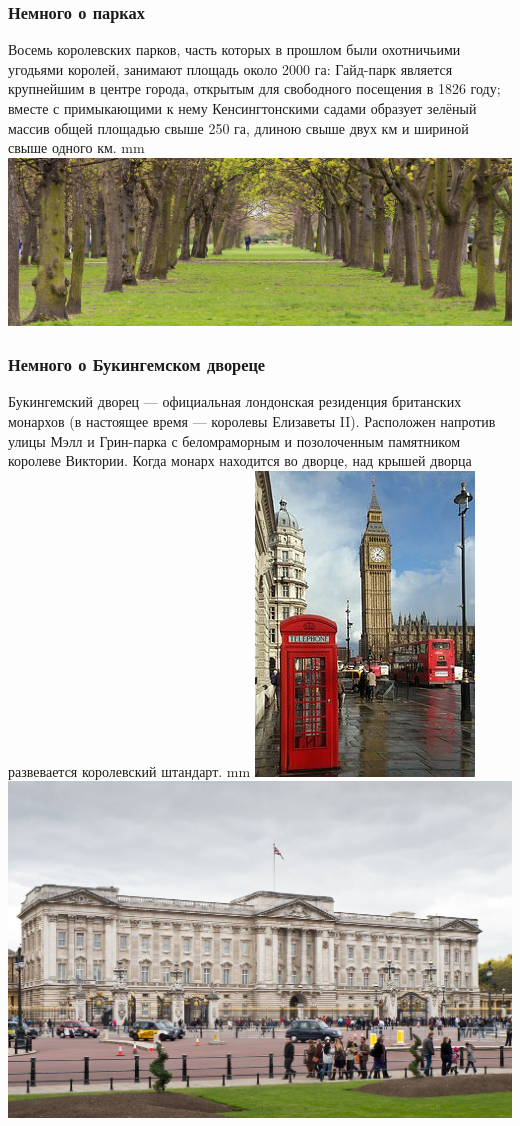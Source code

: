 \documentclass{beamer}
\begin{document}
\begin{frame}
\frametitle{Немного о парках}
Восемь королевских парков, часть которых в прошлом были охотничьими угодьями королей, занимают площадь около 2000 га: Гайд-парк является 
крупнейшим в центре города, открытым для свободного посещения в 1826 году; вместе с примыкающими к нему 
Кенсингтонскими садами образует зелёный массив общей площадью свыше 250 га, длиною свыше двух км и шириной свыше одного км. 
 mm 
\centering\includegraphics[width=1\linewidth]{park02.jpg}
\end{frame}

\begin{frame}
\frametitle{Немного о Букингемском двореце}
Букингемский дворец --- официальная лондонская резиденция 
британских монархов (в настоящее время --- королевы Елизаветы II). 
Расположен напротив улицы Мэлл и Грин-парка с беломраморным и 
позолоченным памятником королеве Виктории. 
Когда монарх находится во дворце, над крышей дворца 
развевается королевский штандарт. 
 mm
\hspace{8 mm}
\includegraphics[width=0.3\linewidth]{london5.jpg}
\hspace{1 cm}
\includegraphics[width=0.5\linewidth]{london01.jpg}
\end{frame}
\end{document}

